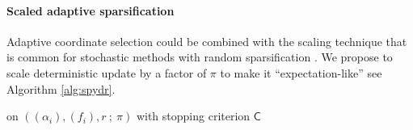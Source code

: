 \paragraph{Scaled adaptive sparsification}
{\color{blue}Adaptive coordinate selection could be combined with the scaling technique that is common for stochastic methods with random sparsification \cite{zhang2014asynchronous}. We propose to scale deterministic update by a factor of $\pi$ to make it ``expectation-like'' see Algorithm \ref{alg:spydr}.


\begin{algorithm}
\caption{\textsc{\maskalgo} on $((\alpha_i),(f_i), r  ~ ; ~  \pi)$ with stopping criterion $\mathsf{C}$}
\label{alg:spydr}
\begin{center}


\end{center}
\end{algorithm}}
